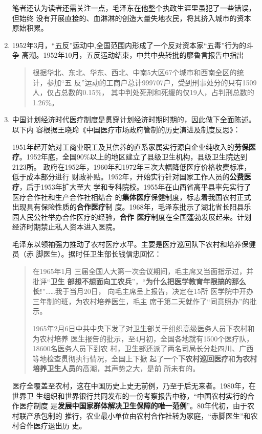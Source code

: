 \begin{enumerate}
  笔者还认为读者还需关注一点，毛泽东在他整个执政生涯里虽犯了一些错误，但始终
  没有开展直接的、血淋淋的创造大量失地农民，将其挤入城市的资本原始积累。


\item 1952年3月，“五反”运动中,全国范围内形成了一个反对资本家“五毒”行为的斗争
  高潮。1952年10月，五反运动结束，中共中央转批的廖鲁言报告中指出
  \begin{quotation}
    根据华北、东北、华东、西北、中南5大区67个城市和西南全区的统计，参加“五
    反”运动的工商户总计999707户，受到刑事处分的只有1509人，仅占总数的0.15\%，
    其中判处死刑和死缓的仅19人，占判刑总数的1.26\%。
  \end{quotation}

\item 中国计划经济时代医疗制度是贯穿计划经济时期时期的，因此做下全面陈述。以下内
  容根据王晓玲《中国医疗市场政府管制的历史演进及制度反思》\cite{yiliaoshi}：

  1951年起开始对工商业职工及其供养的直系家属实行源自企业纯收入的\textbf{劳保医
    疗}。1952年底，全国90\%以上的地区建立了县级卫生机构，县级卫生院达到2123所。
  政府在1952年，1960年和1972年三次大幅降低医疗价格收费标准，低于成本部分进行
  财政补贴。1952年，开始实行针对国家工作人员的\textbf{公费医疗}，后于1953年扩大至大
  学和专科院校。1955年在山西省高平县率先实行了医疗合作社和生产合作社相结合
  的\textbf{集体医疗}保健制度，标志着我国农村正式出现具有保险性质的\textbf{合作医疗}制
  度。1968年，毛泽东批示了湖北省长阳县乐园人民公社举办合作医疗的经验，\textbf{合作
    医疗}制度在全国蓬勃发展起来。计划经济时期禁止私人资本进入医院。

  毛泽东以领袖强力推动了农村医疗水平。主要是医疗巡回队下农村和培养保健员（赤
  脚医生）。据时任卫生部长钱信忠回忆：
  \begin{quotation}
    在1965年1月 三届全国人大第一次会议期间，毛主席又当面指示过，并批评“\textbf{卫生
    部想不想面向工农兵}”，“\textbf{为什么把医学教育年限搞的那么长!}”……我于当月20日，
    向毛主席呈上报告，决定在15所 医学院中开办三年制的班，为农村培养医生，毛主
    席于第二天就作了“同意照办”的批示。

    1965年2月6日中共中央下发了对卫生部关于组织高级医务人员下农村和为农村培养
    医生报告的批示，至4月初，全国各地就有1500个医疗队，18600名医务人员下到农
    村，卫生部还派了两名司局长分赴四川、广西等地检查贯彻执行情况，全国上下掀
    起了一个\textbf{下农村巡回医疗}和\textbf{为农村培养卫生人员}的高潮，其声势之大，是前
    所未有的。
  \end{quotation}

  医疗全覆盖至农村，这在中国历史上史无前例，乃至于后无来者。1980年，在世界卫
  生组织和世界银行共同发布的一份考察报告中称，“中国农村实行的合作医疗制度
  是\textbf{发展中国家群体解决卫生保障的唯一范例}”。80年代初，由于农村联产承包制的
  推行，农业最小单位由农村合作社转为家庭，“赤脚医生”和农村合作医疗退出历
  史。


\end{enumerate}
